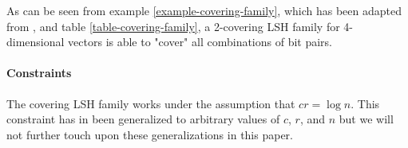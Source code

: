 As can be seen from example \ref{example-covering-family}, which has been adapted from \cite[example 2.1]{DBLP:journals/corr/PhamP16}, and table \ref{table-covering-family}, a 2-covering LSH family for 4-dimensional vectors is able to "cover" all combinations of bit pairs.

\paragraph{Constraints} The covering LSH family works under the assumption that $cr = \log n$. This constraint has in \cite{DBLP:journals/corr/Pagh15} been generalized to arbitrary values of $c$, $r$, and $n$ but we will not further touch upon these generalizations in this paper.
